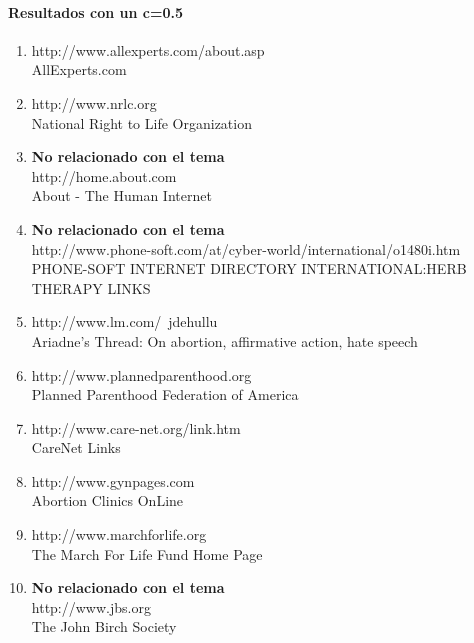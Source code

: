 \paragraph{Resultados con un c=0.5}
 \begin{enumerate}
 \item http://www.allexperts.com/about.asp\\
AllExperts.com
 \item http://www.nrlc.org\\
National Right to Life Organization
 \item \textbf{No relacionado con el tema}\\
 http://home.about.com\\
About - The Human Internet
 \item \textbf{No relacionado con el tema}\\
http://www.phone-soft.com/at/cyber-world/international/o1480i.htm\\
PHONE-SOFT INTERNET DIRECTORY INTERNATIONAL:HERB THERAPY LINKS
 \item http://www.lm.com/~jdehullu\\
Ariadne's Thread: On abortion, affirmative action, hate speech
 \item http://www.plannedparenthood.org\\
Planned Parenthood Federation of America
 \item http://www.care-net.org/link.htm\\
CareNet Links
 \item http://www.gynpages.com\\
Abortion Clinics OnLine
 \item http://www.marchforlife.org\\
The March For Life Fund Home Page
 \item \textbf{No relacionado con el tema}\\
http://www.jbs.org\\
The John Birch Society
 \end{enumerate}
 
